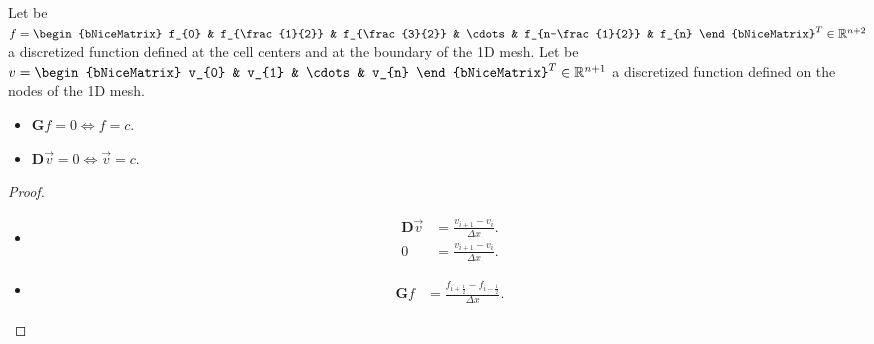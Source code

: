\begin{theorem}{}{}
	Let be
	\begin{math}
		f=
		\begin{bNiceMatrix}
			f_{0}             &
			f_{\frac{1}{2}}   &
			f_{\frac{3}{2}}   &
			\cdots            &
			f_{n-\frac{1}{2}} &
			f_{n}
		\end{bNiceMatrix}^{T}\in\mathbb{R}^{n+2}
	\end{math}
	a discretized function defined at the cell centers and
	at the boundary of the 1D mesh.
	Let be
	\begin{math}
		v=
		\begin{bNiceMatrix}
			v_{0}  &
			v_{1}  &
			\cdots &
			v_{n}
		\end{bNiceMatrix}^{T}\in\mathbb{R}^{n+1}
	\end{math}
	a discretized function defined on the nodes of the 1D mesh.

	\begin{itemize}
		\item

		      \begin{math}
			      \symbf{G}f=
			      0\iff f=
			      c
		      \end{math}.

		\item

		      \begin{math}
			      \symbf{D}\vec{v}=
			      0\iff\vec{v}=
			      c
		      \end{math}.
	\end{itemize}
\end{theorem}

\begin{proof}\leavevmode
	\begin{itemize}
		\item

		      \begin{align*}
			      \symbf{D}\vec{v} & =
			      \frac{v_{i+1}-v_{i}}{\Delta x}. \\
			      0                & =
			      \frac{v_{i+1}-v_{i}}{\Delta x}.
		      \end{align*}

		\item

		      \begin{align*}
			      \symbf{G}f & =
			      \frac{f_{i+\frac{1}{2}}-f_{i-\frac{1}{2}}}{\Delta x}.
		      \end{align*}
	\end{itemize}
\end{proof}

